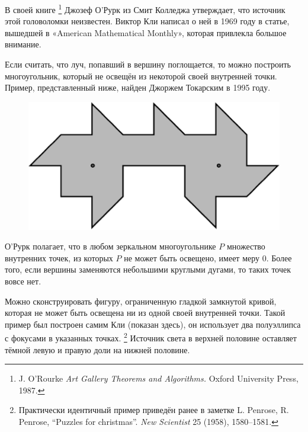 В своей книге%
\footnote{J. O'Rourke \emph{Art Gallery Theorems and Algorithms.} Oxford University Press, 1987.}
Джозеф О’Рурк %
из Смит Колледжа утверждает, что источник этой головоломки неизвестен.
Виктор Кли написал о ней в 1969 году в статье, вышедшей в «American Mathe\-ma\-tical Monthly», которая привлекла большое внимание. 

Если считать, что луч, попавший в вершину поглощается, то можно построить многоугольник, который не освещён из некоторой своей внутренней точки.
Пример, представленный ниже, найден Джоржем Токарским в 1995 году.

\begin{figure}[h!]
\centering
\includegraphics[scale=0.5]{Figs/UnsolvedPuzzles/vision}
\end{figure} 

О’Рурк полагает, что в любом зеркальном многоугольнике $P$ множество внутренних точек, из которых $P$ не может быть освещено, имеет меру 0.
Более того, если вершины заменяются небольшими круглыми дугами, то таких точек вовсе нет.

{\sloppy

Можно сконструировать фигуру, ограниченную гладкой замкнутой кривой, которая не может быть освещена ни из одной своей внутренней точки. 
Такой пример был построен самим Кли (показан здесь), он использует два полуэллипса с фокусами в указанных точках.%
\footnote{Практически идентичный пример приведён ранее в заметке L. Penrose, R. Penrose, ``Puzzles for christmas''. \emph{New Scientist} 25 (1958), 1580--1581.}
Источник света в верхней половине оставляет тёмной левую и правую доли на нижней половине.

}

